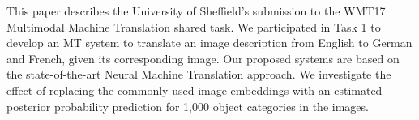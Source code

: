 This paper describes the University of Sheffield's submission to the WMT17 Multimodal Machine Translation shared task. We participated in Task 1 to develop an MT system to translate an image description from English to German and French, given its corresponding image. Our proposed systems are based on the state-of-the-art Neural Machine Translation approach. We investigate the effect of replacing the commonly-used image embeddings with an estimated posterior probability prediction for 1,000 object categories in the images.
